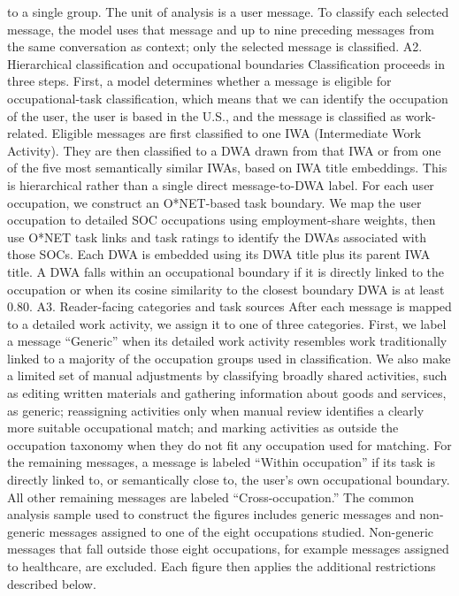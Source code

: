to a single group. The unit of analysis is a user message. To classify each selected message, the model
uses that message and up to nine preceding messages from the same conversation as context; only the
selected message is classified.
A2. Hierarchical classification and occupational boundaries
Classification proceeds in three steps. First, a model determines whether a message is eligible for
occupational-task classification, which means that we can identify the occupation of the user, the user
is based in the U.S., and the message is classified as work-related. Eligible messages are first classified
to one IWA (Intermediate Work Activity). They are then classified to a DWA drawn from that IWA or from
one of the five most semantically similar IWAs, based on IWA title embeddings. This is hierarchical rather
than a single direct message-to-DWA label.
For each user occupation, we construct an O*NET-based task boundary. We map the user occupation to
detailed SOC occupations using employment-share weights, then use O*NET task links and task ratings
to identify the DWAs associated with those SOCs. Each DWA is embedded using its DWA title plus its
parent IWA title. A DWA falls within an occupational boundary if it is directly linked to the occupation or
when its cosine similarity to the closest boundary DWA is at least 0.80.
A3. Reader-facing categories and task sources
After each message is mapped to a detailed work activity, we assign it to one of three categories.
First, we label a message “Generic” when its detailed work activity resembles work traditionally linked
to a majority of the occupation groups used in classification. We also make a limited set of manual
adjustments by classifying broadly shared activities, such as editing written materials and gathering
information about goods and services, as generic; reassigning activities only when manual review
identifies a clearly more suitable occupational match; and marking activities as outside the occupation
taxonomy when they do not fit any occupation used for matching. For the remaining messages, a
message is labeled “Within occupation” if its task is directly linked to, or semantically close to, the user’s
own occupational boundary. All other remaining messages are labeled “Cross-occupation.”
The common analysis sample used to construct the figures includes generic messages and non-generic
messages assigned to one of the eight occupations studied. Non-generic messages that fall outside
those eight occupations, for example messages assigned to healthcare, are excluded. Each figure then
applies the additional restrictions described below.
